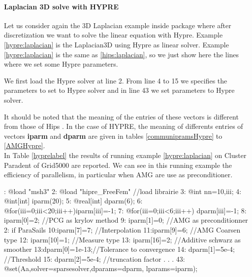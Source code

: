 \documentclass[a4paper,twoside,12pt]{book}
\begin{document}
\paragraph*{Laplacian 3D solve with HYPRE}\label{hypreexample2}
Let us consider again the 3D Laplacian  example inside \freefempp package where
after discretization we want to solve the linear equation with Hypre. Example
\ref{hypre:laplacian} is the Laplacian3D using Hypre as linear solver.
Example \ref{hypre:laplacian} is the same as \ref{hips:laplacian}, so we just
show here the lines where we set some Hypre parameters.

We first load the Hypre solver at line 2. From line 4 to 15 we specifies the
parameters to set to Hypre solver and in line 43
we set parameters to Hypre solver.

 It should be noted that the meaning
of the entries of these vectors is different from those of Hips .
In the case of HYPRE, the meaning of differents entries of vectors
\textbf{iparm} and \textbf{dparm} are given in tables \ref{communipramsHypre} to
\ref{AMGHypre}.\\

In Table \ref{hyprelabel} the results of running example \ref{hypre:laplacian}
on Cluster Paradent of Grid5000 are  reported. We can see in this running
example the efficiency of parallelism, in particular when AMG are use as
preconditioner.
\begin{example}\label{hypre:laplacian}
: @load "msh3"
2: @load "hipre_FreeFem" //load librairie
3: @int nn=10,iii;
4: @int[int] iparm(20);
5: @real[int] dparm(6);
6: @for(iii=0;iii<20;iii++)iparm[iii]=-1;
7: @for(iii=0;iii<6;iii++) dparm[iii]=-1;
8: iparm[0]=2; //PCG as krylov method
9: iparm[1]=0; //AMG as preconditionner 2: if ParaSails
10:iparm[7]=7; //Interpolation
11:iparm[9]=6; //AMG Coarsen type
12: iparm[10]=1; //Measure type
13: iparm[16]=2; //Additive schwarz as smoother
13:dparm[0]=1e-13;//Tolerance to convergence
14: dparm[1]=5e-4; //Threshold
15: dparm[2]=5e-4; //truncation factor
.
.
.
43:    @set(Aa,solver=sparsesolver,dparams=dparm, lparams=iparm);
\eFF
\end{example}
\end{document}
